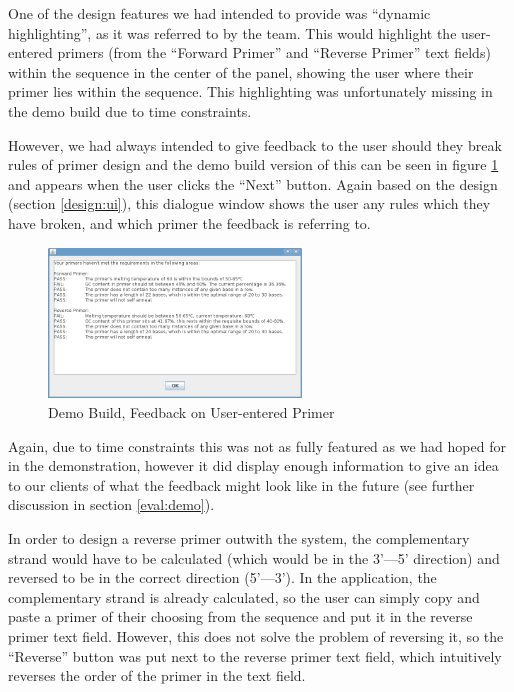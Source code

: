 One of the design features we had intended to provide was ``dynamic
highlighting'', as it was referred to by the team.
This would highlight the user-entered primers (from the ``Forward
Primer'' and ``Reverse Primer'' text fields) within the sequence in
the center of the panel, showing the user where their primer lies
within the sequence.
This highlighting was unfortunately missing in the demo build due to
time constraints.

However, we had always intended to give feedback to the user should
they break rules of primer design and the demo build version of this
can be seen in figure \ref{fig:demoBuild:primerFeedback} and appears
when the user clicks the ``Next'' button.
Again based on the design (section \ref{design:ui}), this dialogue
window shows the user any rules which they have broken, and which
primer the feedback is referring to.

\begin{figure}[!t]
  \begin{center}
    \includegraphics[width=0.6\textwidth]{./images/demoBuild/primerFeedback.png}
    \caption{
      \label{fig:demoBuild:primerFeedback}
      Demo Build, Feedback on User-entered Primer
    }
  \end{center}
\end{figure}

Again, due to time constraints this was not as fully featured as we
had hoped for in the demonstration, however it did display enough
information to give an idea to our clients of what the feedback might
look like in the future (see further discussion in section
\ref{eval:demo}).

In order to design a reverse primer outwith the system, the
complementary strand would have to be calculated (which would be in
the 3'---5' direction) and reversed to be in the correct direction
(5'---3').
In the application, the complementary strand is already calculated, so
the user can simply copy and paste a primer of their choosing from the
sequence and put it in the reverse primer text field.
However, this does not solve the problem of reversing it, so the
``Reverse'' button was put next to the reverse primer text field,
which intuitively reverses the order of the primer in the text
field. 

